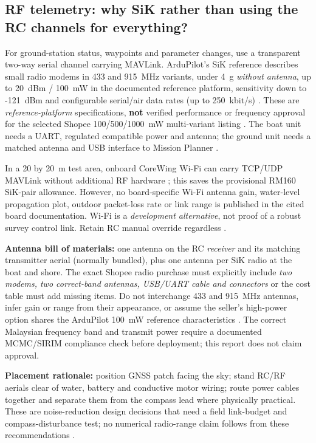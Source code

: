 \subsection{RF telemetry: why SiK rather than using the RC channels for everything?}
For ground-station status, waypoints and parameter changes, use a transparent two-way serial channel carrying MAVLink. ArduPilot's SiK reference describes small radio modems in 433 and 915~MHz variants, under 4~g \emph{without antenna}, up to 20~dBm / 100~mW in the documented reference platform, sensitivity down to -121~dBm and configurable serial/air data rates (up to 250~kbit/s) \cite{radioDoc}. These are \emph{reference-platform} specifications, \textbf{not} verified performance or frequency approval for the selected Shopee 100/500/1000~mW multi-variant listing \cite{radioShop}. The boat unit needs a UART, regulated compatible power and antenna; the ground unit needs a matched antenna and USB interface to Mission Planner \cite{radioDoc,radioConfig}.\par
In a 20 by 20~m test area, onboard CoreWing Wi-Fi can carry TCP/UDP MAVLink without additional RF hardware \cite{coreDoc}; this saves the provisional RM160 SiK-pair allowance. However, no board-specific Wi-Fi antenna gain, water-level propagation plot, outdoor packet-loss rate or link range is published in the cited board documentation. Wi-Fi is a \emph{development alternative}, not proof of a robust survey control link. Retain RC manual override regardless \cite{coreDoc,failsafes}.\par
\textbf{Antenna bill of materials:} one antenna on the RC \emph{receiver} and its matching transmitter aerial (normally bundled), plus one antenna per SiK radio at the boat and shore. The exact Shopee radio purchase must explicitly include \emph{two modems, two correct-band antennas, USB/UART cable and connectors} or the cost table must add missing items. Do not interchange 433 and 915~MHz antennas, infer gain or range from their appearance, or assume the seller's high-power option shares the ArduPilot 100~mW reference characteristics \cite{radioDoc,radioShop}. The correct Malaysian frequency band and transmit power require a documented MCMC/SIRIM compliance check before deployment; this report does not claim approval.\par
\textbf{Placement rationale:} position GNSS patch facing the sky; stand RC/RF aerials clear of water, battery and conductive motor wiring; route power cables together and separate them from the compass lead where physically practical. These are noise-reduction design decisions that need a field link-budget and compass-disturbance test; no numerical radio-range claim follows from these recommendations \cite{gpsYaw,coreDoc,radioDoc}.

